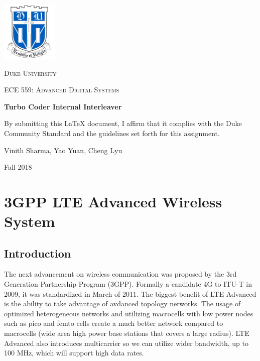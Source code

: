 \documentclass[letterpaper, 12pt]{article} %
\begin{document}
\begin{titlepage}
	\centering
	\includegraphics[width=0.2\textwidth]{files/Duke_logo.png}\par\vspace{1cm}
	{\scshape\LARGE Duke University \par}
	\vspace{1cm}
	{\scshape\Large ECE 559: Advanced Digital Systems \par}
	\vspace{1.5cm}
	{\huge\bfseries Turbo Coder Internal Interleaver \par}
	\vspace{2cm}
   {By submitting this \LaTeX{} document, I affirm that it complies with the Duke Community Standard and the guidelines set forth for this assignment.\par}
   \vspace{1cm}
	{\Large Vinith Sharma, Yao Yuan, Cheng Lyu}
	\vfill
	{\large Fall 2018\par}
\end{titlepage}

\newpage
\section{3GPP LTE Advanced Wireless System}
    \subsection{Introduction}
        The next advancement on wireless communication was proposed by the 3rd Generation Partnership Program (3GPP). Formally a candidate 4G to ITU-T in 2009, it was standardized in March of 2011.
        The biggest benefit of LTE Advanced is the ability to take advantage of avdanced topology networks. The usage of optimized heterogeneous networks and utilizing macrocells with low power nodes such as pico and femto cells create a much better network compared to macrocells (wide area high power base stations that covers a large radius). LTE Advanced also introduces multicarrier so we can utilize wider bandwidth, up to 100 MHz, which will support high data rates.
\end{document}
